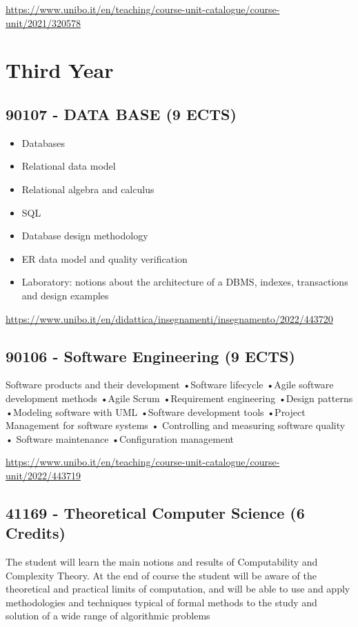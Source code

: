\documentclass{article}
\begin{document}
\url{https://www.unibo.it/en/teaching/course-unit-catalogue/course-unit/2021/320578}

\section{Third Year}

\subsection{90107 - DATA BASE (9 ECTS)}

\begin{itemize}
    \item Databases
    \item Relational data model
    \item Relational algebra and calculus
    \item SQL
    \item Database design methodology
    \item ER data model and quality verification
    \item Laboratory: notions about the architecture of a DBMS, indexes, transactions and design examples

\end{itemize}

\url{https://www.unibo.it/en/didattica/insegnamenti/insegnamento/2022/443720}

\subsection{90106 - Software Engineering (9 ECTS)}

Software products and their development •Software lifecycle •Agile software development methods •Agile Scrum •Requirement engineering •Design patterns •Modeling software with UML •Software development tools •Project Management for software systems • Controlling and measuring software quality • Software maintenance •Configuration management

\url{https://www.unibo.it/en/teaching/course-unit-catalogue/course-unit/2022/443719}

\subsection{41169 - Theoretical Computer Science (6 Credits)}

The student will learn the main notions and results of Computability and Complexity Theory. At the end of course the student will be aware of the theoretical and practical limits of computation, and will be able to use and apply methodologies and techniques typical of formal methods to the study and solution of a wide range of algorithmic problems
\end{document}
